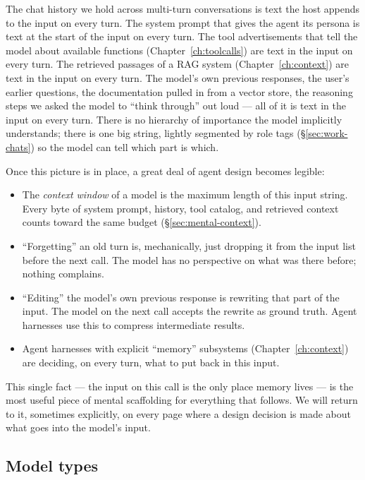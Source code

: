 The chat history we hold across multi-turn conversations is text
the host appends to the input on every turn. The system prompt
that gives the agent its persona is text at the start of the input
on every turn. The tool advertisements that tell the model about
available functions (Chapter~\ref{ch:toolcalls}) are text in the
input on every turn. The retrieved passages of a RAG system
(Chapter~\ref{ch:context}) are text in the input on every turn.
The model's own previous responses, the user's earlier questions,
the documentation pulled in from a vector store, the reasoning
steps we asked the model to ``think through'' out loud --- all of
it is text in the input on every turn. There is no hierarchy of
importance the model implicitly understands; there is one big
string, lightly segmented by role tags (\S\ref{sec:work-chats}) so
the model can tell which part is which.

Once this picture is in place, a great deal of agent design
becomes legible:

\begin{itemize}[leftmargin=1.5em,itemsep=0.2em]
\item The \emph{context window} of a model is the maximum length
  of this input string. Every byte of system prompt, history,
  tool catalog, and retrieved context counts toward the same
  budget (\S\ref{sec:mental-context}).
\item ``Forgetting'' an old turn is, mechanically, just dropping
  it from the input list before the next call. The model has no
  perspective on what was there before; nothing complains.
\item ``Editing'' the model's own previous response is rewriting
  that part of the input. The model on the next call accepts the
  rewrite as ground truth. Agent harnesses use this to compress
  intermediate results.
\item Agent harnesses with explicit ``memory'' subsystems
  (Chapter~\ref{ch:context}) are deciding, on every turn, what
  to put back in this input.
\end{itemize}

\noindent
This single fact --- the input on this call is the only place
memory lives --- is the most useful piece of mental scaffolding
for everything that follows. We will return to it, sometimes
explicitly, on every page where a design decision is made about
what goes into the model's input.

\subsection{Model types}
\label{sec:mental-types}

